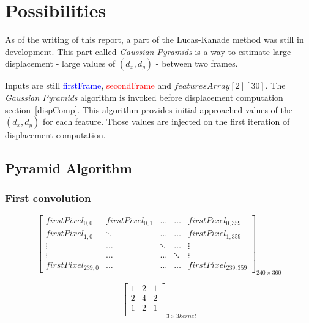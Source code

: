 
\section{Possibilities}

As of the writing of this report, a part of the Lucas-Kanade method was still in development. This part called \emph{Gaussian Pyramids} is a way to estimate large displacement - large values of $(d_{x},d_{y})$ - between two frames.

Inputs are still \textcolor{blue}{firstFrame}, \textcolor{red}{secondFrame} and  $featuresArray[2][30]$. The \emph{Gaussian Pyramids} algorithm is invoked before displacement computation section~\ref{dispComp}. This algorithm provides initial approached values of the $(d_{x},d_{y})$ for each feature. Those values are injected on the first iteration of displacement computation.

\subsection{Pyramid Algorithm}

\subsubsection{First convolution}

\noindent\begin{minipage}{.3\textwidth}
\[
\begin{bmatrix}

firstPixel_{0,0} & firstPixel_{0,1} & \ldots & \ldots & firstPixel_{0,359}\\

firstPixel_{1,0} & \ddots & \ldots & \ldots & firstPixel_{1,359}\\

\vdots & \ldots & \ddots & \ldots & \vdots\\

\vdots & \ldots & \ldots & \ddots & \vdots\\

firstPixel_{239,0} & \ldots & \ldots  & \ldots & firstPixel_{239,359}

\end{bmatrix}_{240\times 360}
\]
\end{minipage}\hfill
\begin{minipage}{.3\textwidth}
\[
\begin{bmatrix}

1 & 2 & 1\\

2 & 4 & 2\\

1 & 2 & 1\\

\end{bmatrix}_{3\times 3 kernel}
\]
\end{minipage}


